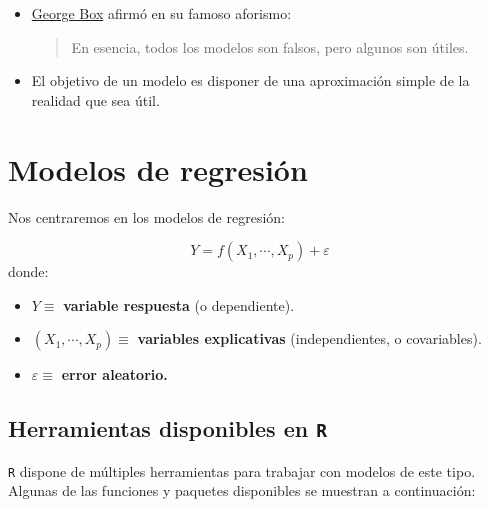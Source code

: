 \documentclass[
]{book}
\theoremstyle{break}
\theoremstyle{nonumberplain}
\begin{document}
\begin{itemize}
\item
  \href{https://en.wikipedia.org/wiki/George_E._P._Box}{George Box} afirmó en su famoso aforismo:

  \begin{quote}
  En esencia, todos los modelos son falsos, pero algunos son útiles.
  \end{quote}
\item
  El objetivo de un modelo es disponer de una aproximación simple de la realidad que sea útil.
\end{itemize}

\hypertarget{modelos-de-regresiuxf3n}{%
\section{Modelos de regresión}\label{modelos-de-regresiuxf3n}}

Nos centraremos en los modelos de regresión:

\[Y=f(X_{1},\cdots,X_{p})+\varepsilon\]
donde:

\begin{itemize}
\item
  \(Y\equiv\) \textbf{variable respuesta} (o dependiente).
\item
  \(\left( X_{1},\cdots,X_{p}\right) \equiv\) \textbf{variables
  explicativas} (independientes, o covariables).
\item
  \(\varepsilon\equiv\) \textbf{error aleatorio.}
\end{itemize}

\hypertarget{herramientas-disponibles-en-r}{%
\subsection{\texorpdfstring{Herramientas disponibles en \texttt{R}}{Herramientas disponibles en R}}\label{herramientas-disponibles-en-r}}

\texttt{R} dispone de múltiples herramientas para trabajar con modelos de este tipo. Algunas de las funciones y paquetes disponibles se muestran a continuación:
\end{document}
